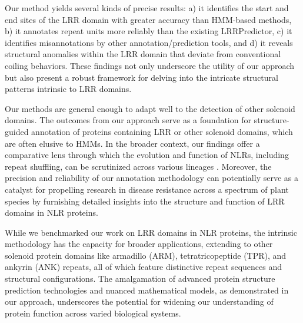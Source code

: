 \documentclass[authoryear]{article}
\begin{document}



Our method yields several kinds of precise results: a) it identifies the start and end sites of the LRR domain with greater accuracy than HMM-based methods, b) it annotates repeat units more reliably than the existing LRRPredictor, c) it identifies misannotations by other annotation/prediction tools, and d) it reveals structural anomalies within the LRR domain that deviate from conventional coiling behaviors. These findings not only underscore the utility of our approach but also present a robust framework for delving into the intricate structural patterns intrinsic to LRR domains.

Our methods are general enough to adapt well to the detection of other solenoid domains. The outcomes from our approach serve as a foundation for structure-guided annotation of proteins containing LRR or other solenoid domains, which are often elusive to HMMs. In the broader context, our findings offer a comparative lens through which the evolution and function of NLRs, including repeat shuffling, can be scrutinized across various lineages \cite{steuernagel2020nlr}. Moreover, the precision and reliability of our annotation methodology can potentially serve as a catalyst for propelling research in disease resistance across a spectrum of plant species by furnishing detailed insights into the structure and function of LRR domains in NLR proteins.

While we benchmarked our work on LRR domains in NLR proteins, the intrinsic methodology has the capacity for broader applications, extending to other solenoid protein domains like armadillo (ARM), tetratricopeptide (TPR), and ankyrin (ANK) repeats, all of which feature distinctive repeat sequences and structural configurations. The amalgamation of advanced protein structure prediction technologies and nuanced mathematical models, as demonstrated in our approach, underscores the potential for widening our understanding of protein function across varied biological systems.
\end{document}
